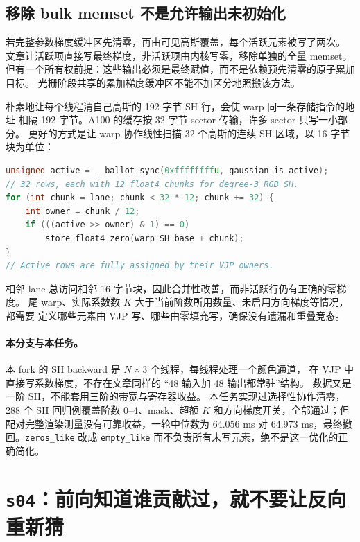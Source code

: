 \subsection{移除 bulk memset 不是允许输出未初始化}

若完整参数梯度缓冲区先清零，再由可见高斯覆盖，每个活跃元素被写了两次。
文章让活跃项直接写最终梯度，非活跃项由内核写零，移除单独的全量 memset。
但有一个所有权前提：这些输出必须是最终赋值，而不是依赖预先清零的原子累加目标。
光栅阶段共享的累加梯度缓冲区不能不加区分地照搬该方法。

朴素地让每个线程清自己高斯的 192 字节 SH 行，会使 warp 同一条存储指令的地址
相隔 192 字节。A100 的缓存按 32 字节 sector 传输，许多 sector 只写一小部分。
更好的方式是让 warp 协作线性扫描 32 个高斯的连续 SH 区域，以 16 字节块为单位：

\begin{lstlisting}[language=C++,basicstyle=\ttfamily\small,breaklines=true]
unsigned active = __ballot_sync(0xffffffffu, gaussian_is_active);
// 32 rows, each with 12 float4 chunks for degree-3 RGB SH.
for (int chunk = lane; chunk < 32 * 12; chunk += 32) {
    int owner = chunk / 12;
    if (((active >> owner) & 1) == 0)
        store_float4_zero(warp_SH_base + chunk);
}
// Active rows are fully assigned by their VJP owners.
\end{lstlisting}

相邻 lane 总访问相邻 16 字节块，因此合并性改善，而非活跃行仍有正确的零梯度。
尾 warp、实际系数数 $K$ 大于当前阶数所用数量、未启用方向梯度等情况，都需要
定义哪些元素由 VJP 写、哪些由零填充写，确保没有遗漏和重叠竞态。

\paragraph{本分支与本任务。}
本 fork 的 SH backward 是 $N\times3$ 个线程，每线程处理一个颜色通道，
在 VJP 中直接写系数梯度，不存在文章同样的 ``48 输入加 48 输出都常驻''结构。
数据又是一阶 SH，不能套用三阶的带宽与寄存器收益。
本任务实现过选择性协作清零，288 个 SH 回归例覆盖阶数 0--4、mask、超额 $K$
和方向梯度开关，全部通过；但配对完整渲染测量没有可靠收益，一轮中位数为
64.056 ms 对 64.973 ms，最终撤回。\texttt{zeros\_like} 改成
\texttt{empty\_like} 而不负责所有未写元素，绝不是这一优化的正确简化。

\section{\texttt{s04}：前向知道谁贡献过，就不要让反向重新猜}

